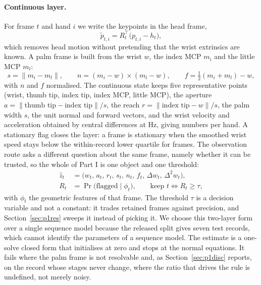 \documentclass{swmcmthesis}
\begin{document}
\paragraph{Continuous layer.} For frame $t$ and hand $i$ we write the keypoints in
the head frame,
\begin{equation}
\tilde p_{t,i}=R_t^{\top}\big(p_{t,i}-h_t\big),
\label{eq:palmframe}
\end{equation}
which removes head motion without pretending that the wrist extrinsics are known. A
palm frame is built from the wrist $w$, the index MCP $m_i$ and the little MCP $m_l$:
\begin{equation}
s=\big\lVert m_i-m_l\big\rVert,\qquad
n=(m_i-w)\times(m_l-w),\qquad
f=\tfrac12(m_i+m_l)-w,
\label{eq:palmaxes}
\end{equation}
with $n$ and $f$ normalised. The continuous state keeps five
representative points (wrist, thumb tip, index tip, index MCP, little MCP), the
aperture $a=\lVert \text{thumb tip}-\text{index tip}\rVert/s$, the reach
$r=\lVert \text{index tip}-w\rVert/s$, the palm width $s$, the unit normal and
forward vectors, and the wrist velocity and acceleration obtained by central
differences at \slotFPS{} Hz, giving \slotDataStateDim{} numbers per hand. A
stationary flag closes the layer: a frame is stationary when the smoothed wrist
speed stays below the within-record lower quartile for \slotSmoothWin{} frames.
The observation route asks a different question about the same frame, namely whether it
can be trusted, so the whole of Part I is one object and one threshold:
\begin{equation}
\begin{aligned}
\hat z_t&=\big(w_t,\,a_t,\,r_t,\,s_t,\,n_t,\,f_t,\,\Delta w_t,\,\Delta^2 w_t\big),\\
R_t&=\Pr\big(\text{flagged}\mid\phi_t\big),\qquad \text{keep }t\iff R_t\ge\tau,
\end{aligned}
\label{eq:state}
\end{equation}
with $\phi_t$ the geometric features of that frame. The threshold $\tau$ is a decision
variable and not a constant: it trades retained frames against precision, and
Section~\ref{sec:p1res} sweeps it instead of picking it. We choose this two-layer form
over a single sequence model because the released split gives seven test records, which
cannot identify the parameters of a sequence model. The estimate is a one-solve closed
form that initialises at zero and stops at the normal equations. It fails where the palm
frame is not resolvable and, as Section~\ref{sec:p1disc} reports, on the record whose
stages never change, where the ratio that drives the rule is undefined, not merely noisy.
\end{document}
